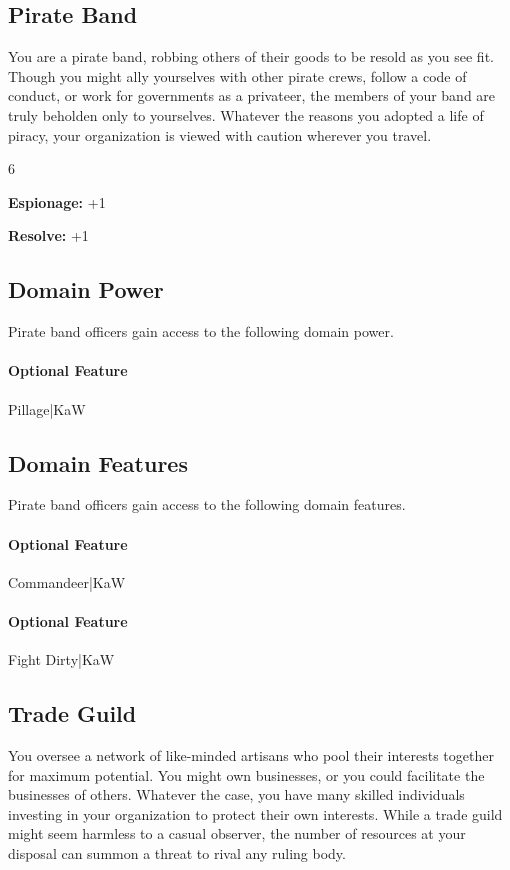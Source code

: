 \documentclass[10pt,a4paper,twoside,bg=print,twocolumn,openany,nodeprecatedcode]{dndbook}
\begin{document}
\subsection{Pirate Band}
You are a pirate band, robbing others of their goods to be resold as you see fit. Though you might ally yourselves with other pirate crews, follow a code of conduct, or work for governments as a privateer, the members of your band are truly beholden only to yourselves. Whatever the reasons you adopted a life of piracy, your organization is viewed with caution wherever you travel.

{\par \vspace { 9pt plus 3pt minus 3pt } \noindent  {} \nopagebreak }

\begin{itemize}
\begin{multicols}{6}
\item \textbf{Espionage:} +1
\item \textbf{Resolve:} +1
\end{multicols}

\end{itemize}

\subsection{Domain Power}
Pirate band officers gain access to the following domain power.

\paragraph{Optional Feature}
Pillage|KaW

\subsection{Domain Features}
Pirate band officers gain access to the following domain features.

\paragraph{Optional Feature}
Commandeer|KaW

\paragraph{Optional Feature}
Fight Dirty|KaW

\subsection{Trade Guild}
You oversee a network of like-minded artisans who pool their interests together for maximum potential. You might own businesses, or you could facilitate the businesses of others. Whatever the case, you have many skilled individuals investing in your organization to protect their own interests. While a trade guild might seem harmless to a casual observer, the number of resources at your disposal can summon a threat to rival any ruling body.
\end{document}
